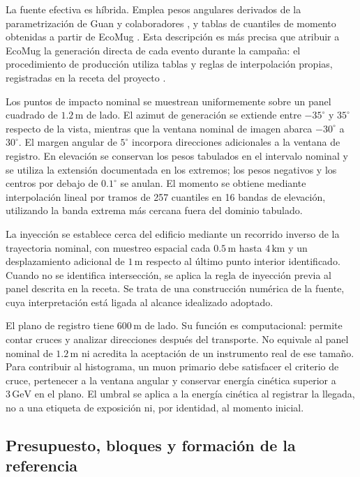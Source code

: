 \documentclass[11pt,a4paper]{article}
\begin{document}
La fuente efectiva es híbrida. Emplea pesos angulares derivados de la parametrización de Guan y colaboradores \cite{guan2015}, y tablas de cuantiles de momento obtenidas a partir de EcoMug \cite{pagano2021}. Esta descripción es más precisa que atribuir a EcoMug la generación directa de cada evento durante la campaña: el procedimiento de producción utiliza tablas y reglas de interpolación propias, registradas en la receta del proyecto \cite{receta}.

Los puntos de impacto nominal se muestrean uniformemente sobre un panel cuadrado de $1.2\,\mathrm m$ de lado. El azimut de generación se extiende entre $-35^\circ$ y $35^\circ$ respecto de la vista, mientras que la ventana nominal de imagen abarca $-30^\circ$ a $30^\circ$. El margen angular de $5^\circ$ incorpora direcciones adicionales a la ventana de registro. En elevación se conservan los pesos tabulados en el intervalo nominal y se utiliza la extensión documentada en los extremos; los pesos negativos y los centros por debajo de $0.1^\circ$ se anulan. El momento se obtiene mediante interpolación lineal por tramos de 257 cuantiles en 16 bandas de elevación, utilizando la banda extrema más cercana fuera del dominio tabulado.

La inyección se establece cerca del edificio mediante un recorrido inverso de la trayectoria nominal, con muestreo espacial cada $0.5\,\mathrm m$ hasta $4\,\mathrm{km}$ y un desplazamiento adicional de $1\,\mathrm m$ respecto al último punto interior identificado. Cuando no se identifica intersección, se aplica la regla de inyección previa al panel descrita en la receta. Se trata de una construcción numérica de la fuente, cuya interpretación está ligada al alcance idealizado adoptado.

El plano de registro tiene $600\,\mathrm m$ de lado. Su función es computacional: permite contar cruces y analizar direcciones después del transporte. No equivale al panel nominal de $1.2\,\mathrm m$ ni acredita la aceptación de un instrumento real de ese tamaño. Para contribuir al histograma, un muon primario debe satisfacer el criterio de cruce, pertenecer a la ventana angular y conservar energía cinética superior a $3\,\mathrm{GeV}$ en el plano. El umbral se aplica a la energía cinética al registrar la llegada, no a una etiqueta de exposición ni, por identidad, al momento inicial.

\subsection{Presupuesto, bloques y formación de la referencia}
\end{document}
